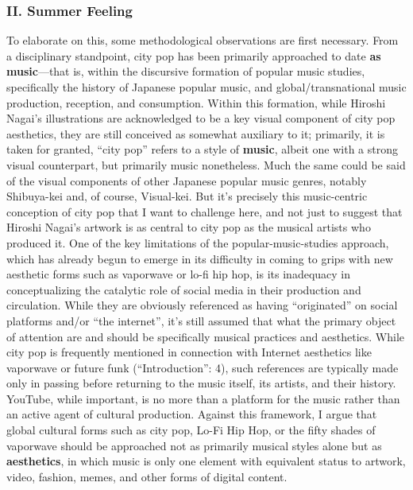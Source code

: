 \documentclass[
  letterpaper,
  DIV=11,
  numbers=noendperiod,
  oneside]{scrartcl}
\begin{document}
\subsubsection{II. Summer Feeling}\label{ii.-summer-feeling}

To elaborate on this, some methodological observations are first
necessary. From a disciplinary standpoint, city pop has been primarily
approached to date \textbf{as music}---that is, within the discursive
formation of popular music studies, specifically the history of Japanese
popular music, and global/transnational music production, reception, and
consumption. Within this formation, while Hiroshi Nagai's illustrations
are acknowledged to be a key visual component of city pop aesthetics,
they are still conceived as somewhat auxiliary to it; primarily, it is
taken for granted, ``city pop'' refers to a style of \textbf{music},
albeit one with a strong visual counterpart, but primarily music
nonetheless. Much the same could be said of the visual components of
other Japanese popular music genres, notably Shibuya-kei and, of course,
Visual-kei. But it's precisely this music-centric conception of city pop
that I want to challenge here, and not just to suggest that Hiroshi
Nagai's artwork is as central to city pop as the musical artists who
produced it. One of the key limitations of the popular-music-studies
approach, which has already begun to emerge in its difficulty in coming
to grips with new aesthetic forms such as vaporwave or lo-fi hip hop, is
its inadequacy in conceptualizing the catalytic role of social media in
their production and circulation. While they are obviously referenced as
having ``originated'' on social platforms and/or ``the internet'', it's
still assumed that what the primary object of attention are and should
be specifically musical practices and aesthetics. While city pop is
frequently mentioned in connection with Internet aesthetics like
vaporwave or future funk (``Introduction'': 4), such references are
typically made only in passing before returning to the music itself, its
artists, and their history. YouTube, while important, is no more than a
platform for the music rather than an active agent of cultural
production. Against this framework, I argue that global cultural forms
such as city pop, Lo-Fi Hip Hop, or the fifty shades of vaporwave should
be approached not as primarily musical styles alone but as
\textbf{aesthetics}, in which music is only one element with equivalent
status to artwork, video, fashion, memes, and other forms of digital
content.
\end{document}
